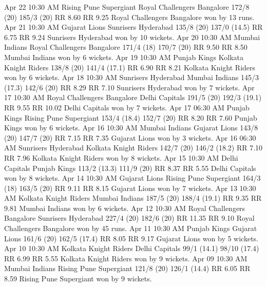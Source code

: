 Apr 22
10:30 AM
Rising Pune Supergiant
Royal Challengers Bangalore
172/8 (20)
185/3 (20)
RR 8.60
RR 9.25
Royal Challengers Bangalore won by 13 runs.
Apr 21
10:30 AM
Gujarat Lions
Sunrisers Hyderabad
135/8 (20)
137/0 (14.5)
RR 6.75
RR 9.24
Sunrisers Hyderabad won by 10 wickets.
Apr 20
10:30 AM
Mumbai Indians
Royal Challengers Bangalore
171/4 (18)
170/7 (20)
RR 9.50
RR 8.50
Mumbai Indians won by 6 wickets.
Apr 19
10:30 AM
Punjab Kings
Kolkata Knight Riders
138/8 (20)
141/4 (17.1)
RR 6.90
RR 8.21
Kolkata Knight Riders won by 6 wickets.
Apr 18
10:30 AM
Sunrisers Hyderabad
Mumbai Indians
145/3 (17.3)
142/6 (20)
RR 8.29
RR 7.10
Sunrisers Hyderabad won by 7 wickets.
Apr 17
10:30 AM
Royal Challengers Bangalore
Delhi Capitals
191/5 (20)
192/3 (19.1)
RR 9.55
RR 10.02
Delhi Capitals won by 7 wickets.
Apr 17
06:30 AM
Punjab Kings
Rising Pune Supergiant
153/4 (18.4)
152/7 (20)
RR 8.20
RR 7.60
Punjab Kings won by 6 wickets.
Apr 16
10:30 AM
Mumbai Indians
Gujarat Lions
143/8 (20)
147/7 (20)
RR 7.15
RR 7.35
Gujarat Lions won by 3 wickets.
Apr 16
06:30 AM
Sunrisers Hyderabad
Kolkata Knight Riders
142/7 (20)
146/2 (18.2)
RR 7.10
RR 7.96
Kolkata Knight Riders won by 8 wickets.
Apr 15
10:30 AM
Delhi Capitals
Punjab Kings
113/2 (13.3)
111/9 (20)
RR 8.37
RR 5.55
Delhi Capitals won by 8 wickets.
Apr 14
10:30 AM
Gujarat Lions
Rising Pune Supergiant
164/3 (18)
163/5 (20)
RR 9.11
RR 8.15
Gujarat Lions won by 7 wickets.
Apr 13
10:30 AM
Kolkata Knight Riders
Mumbai Indians
187/5 (20)
188/4 (19.1)
RR 9.35
RR 9.81
Mumbai Indians won by 6 wickets.
Apr 12
10:30 AM
Royal Challengers Bangalore
Sunrisers Hyderabad
227/4 (20)
182/6 (20)
RR 11.35
RR 9.10
Royal Challengers Bangalore won by 45 runs.
Apr 11
10:30 AM
Punjab Kings
Gujarat Lions
161/6 (20)
162/5 (17.4)
RR 8.05
RR 9.17
Gujarat Lions won by 5 wickets.
Apr 10
10:30 AM
Kolkata Knight Riders
Delhi Capitals
99/1 (14.1)
98/10 (17.4)
RR 6.99
RR 5.55
Kolkata Knight Riders won by 9 wickets.
Apr 09
10:30 AM
Mumbai Indians
Rising Pune Supergiant
121/8 (20)
126/1 (14.4)
RR 6.05
RR 8.59
Rising Pune Supergiant won by 9 wickets.